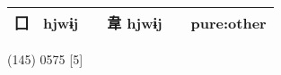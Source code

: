 \documentclass[14pt,a4paper]{scrartcl}
\begin{document}
\begin{longtable}[c]{@{}llllll@{}}
\begin{minipage}[t]{0.14\columnwidth}
囗
\strut\end{minipage} &
\begin{minipage}[t]{0.14\columnwidth}\raggedright\strut
hjwɨj
\strut\end{minipage} &
\begin{minipage}[t]{0.14\columnwidth}\raggedright\strut
\strut\end{minipage} &
\begin{minipage}[t]{0.14\columnwidth}\raggedright\strut
韋 hjwɨj
\strut\end{minipage} &
\begin{minipage}[t]{0.14\columnwidth}\raggedright\strut
\strut\end{minipage} &
\begin{minipage}[t]{0.14\columnwidth}\raggedright\strut
pure:other
\strut\end{minipage}\tabularnewline
\bottomrule
\end{longtable}

(145) 0575 {[}5{]}
\end{document}
